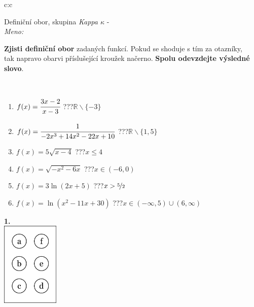 \documentclass[10pt]{report}
\begin{document}
\begin{tabular}{c:c}
\begin{minipage}[c][104.5mm][t]{0.5\linewidth}
\begin{center}
\vspace{7mm}
{\huge Definiční obor, skupina \textit{Kappa $\kappa$} -}\\[5mm]
\textit{Meno:}\phantom{xxxxxxxxxxxxxxxxxxxxxxxxxxxxxxxxxxxxxxxxxxxxxxxxxxxxxxxxxxxxxxxxx}\\[5mm]
\begin{minipage}{0.95\linewidth}
\textbf{Zjisti definiční obor} zadaných funkcí. Pokud se shoduje s tím za otazníky,\\tak napravo obarvi příslušející kroužek načerno. \textbf{Spolu odevzdejte výsledné slovo}.
\end{minipage}
\\[1mm]
\begin{minipage}{0.79\linewidth}
\begin{center}
\begin{varwidth}{\linewidth}
\begin{enumerate}
\normalsizerrr
\item $f(x)=\cfrac{3x-2}{x-3}$\quad \dotfill\; ???\;\dotfill \quad $\mathbb{R}\smallsetminus\{-3\}$
\item $f(x)=\cfrac{1}{-2x^3+14x^2-22x+10}$\quad \dotfill\; ???\;\dotfill \quad $\mathbb{R}\smallsetminus\{1,5\}$
\item $f(x)=5\sqrt{x-4}$\quad \dotfill\; ???\;\dotfill \quad $x\leq4$
\item $f(x)=\sqrt{-x^2-6x}$\quad \dotfill\; ???\;\dotfill \quad $x\in(-6 , 0)$
\item $f(x)=3\ln{(2x+5)}$\quad \dotfill\; ???\;\dotfill \quad $x>\nicefrac{5}{2}$
\item $f(x)=\ln{(x^2-11x+30)}$\quad \dotfill\; ???\;\dotfill \quad $x\in(-\infty , 5)\cup(6 , \infty)$
\end{enumerate}
\end{varwidth}
\end{center}
\end{minipage}
\begin{minipage}{0.20\linewidth}
\begin{center}
{\Huge\bfseries 1.} \\[2mm]
\includegraphics[height=40mm]{../images/braille.png}

\end{center}
\end{minipage}
\end{center}
\end{minipage}
\end{tabular}
\end{document}
